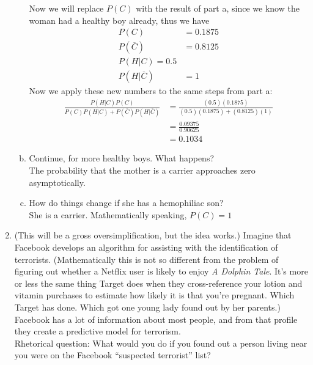 \documentclass{scrartcl}
\begin{document}
\begin{enumerate}
\begin{enumerate}[a)]
      Now we will replace $P(C)$ with the result of part a, since we know the woman had a healthy boy already, thus we have 
      \begin{align*}
        P(C) &= 0.1875\\
        P(\overline{C}) &= 0.8125\\
        P(H|C) = 0.5\\
        P(H|\overline{C}) &= 1
      \end{align*}
      Now we apply these new numbers to the same steps from part a:
      \begin{align*}
        \frac{P(H|C)P(C)}{P(C)P(H|C) + P(\overline{C})P(H|\overline{C})} &= \frac{(0.5)(0.1875)}{(0.5)(0.1875) + (0.8125)(1)}\\
                                                                         &= \frac{0.09375}{0.90625}\\
                                                                         &= 0.1034
      \end{align*}

      \item Continue, for more healthy boys. What happens?\\
 
        The probability that the mother is a carrier approaches zero asymptotically.\\

      \item How do things change if she has a hemophiliac son?\\

        She is a carrier. Mathematically speaking, $P(C) = 1$
\end{enumerate}
\pagebreak
\item (This will be a gross oversimplification, but the idea works.) Imagine that Facebook develops an algorithm for assisting with the identification of terrorists. (Mathematically this is not so  different from the problem of figuring out whether a Netflix user is likely to enjoy \emph{A Dolphin Tale}. It’s more or less the same thing Target does when they cross-reference your lotion and  vitamin purchases to estimate how likely it is that you’re pregnant. Which Target has done. Which got one young lady found out by her parents.) Facebook has a lot of information about most people, and from that profile they create a predictive model for terrorism.\\

Rhetorical question: What would you do if you found out a person living near you were on the Facebook “suspected terrorist” list?\\


\end{enumerate}
\end{document}
